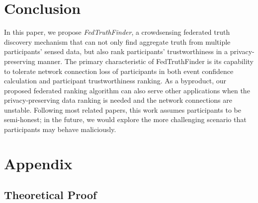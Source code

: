 \documentclass[11pt]{article}
\begin{document}
%
%

\section{Conclusion}

In this paper, we propose \textit{FedTruthFinder}, a crowdsensing federated truth discovery mechanism that can not only find aggregate truth from multiple participants' sensed data, but also rank participants' trustworthiness in a privacy-preserving manner. The primary characteristic of FedTruthFinder is its capability to tolerate network connection loss of participants in both event confidence calculation and participant trustworthiness ranking. As a byproduct, our proposed federated ranking algorithm can also serve other applications when the privacy-preserving data ranking is needed and the network connections are unstable.
Following most related papers, this work assumes participants to be semi-honest; in the future, we would explore the more challenging scenario that participants may behave maliciously.%



\section{Appendix}

\subsection{Theoretical Proof}

%
\end{document}
